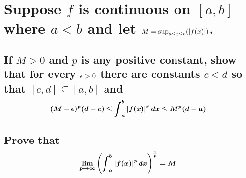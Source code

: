 \section{Suppose $f$ is continuous on $[a,b]$ where $a<b$
     and let $M = \sup_{a\leq x \leq b} (\left|f(x)\right|)$.}

     \subsection{If $M > 0$ and $p$ is any positive constant,
        show that for every $\epsilon > 0$
        there are constants $c<d$ 
        so that $[c,d] \subseteq [a,b]$
        and
        \[
            \bm{
                (M-\epsilon)^p (d-c) 
                \leq 
                \int_a^b \left|f(x)\right|^p dx 
                \leq
                M^p(d-a)
            }
        \]
    }

    \subsection{Prove that
        \[
            \bm{
                \lim_{p\to \infty}\left(\int_a^b \left|f(x)\right|^p dx \right )^{\frac{1}{p}} = M
            }
        \]
    }